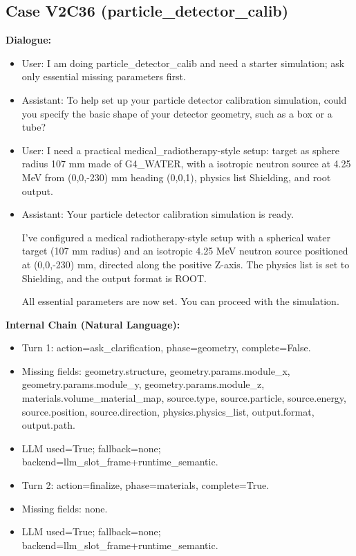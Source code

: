 \documentclass[11pt]{ctexart}
\begin{document}
\subsection{Case V2C36 (particle\_detector\_calib)}
\textbf{Dialogue:}
\begin{itemize}
\item User: I am doing particle\_detector\_calib and need a starter simulation; ask only essential missing parameters first.
\item Assistant: To help set up your particle detector calibration simulation, could you specify the basic shape of your detector geometry, such as a box or a tube?
\item User: I need a practical medical\_radiotherapy-style setup: target as sphere radius 107 mm made of G4\_WATER, with a isotropic neutron source at 4.25 MeV from (0,0,-230) mm heading (0,0,1), physics list Shielding, and root output.
\item Assistant: Your particle detector calibration simulation is ready.

I've configured a medical radiotherapy-style setup with a spherical water target (107 mm radius) and an isotropic 4.25 MeV neutron source positioned at (0,0,-230) mm, directed along the positive Z-axis. The physics list is set to Shielding, and the output format is ROOT.

All essential parameters are now set. You can proceed with the simulation.
\end{itemize}
\textbf{Internal Chain (Natural Language):}
\begin{itemize}
\item Turn 1: action=ask\_clarification, phase=geometry, complete=False.
\item Missing fields: geometry.structure, geometry.params.module\_x, geometry.params.module\_y, geometry.params.module\_z, materials.volume\_material\_map, source.type, source.particle, source.energy, source.position, source.direction, physics.physics\_list, output.format, output.path.
\item LLM used=True; fallback=none; backend=llm\_slot\_frame+runtime\_semantic.
\item Turn 2: action=finalize, phase=materials, complete=True.
\item Missing fields: none.
\item LLM used=True; fallback=none; backend=llm\_slot\_frame+runtime\_semantic.
\end{itemize}
\end{document}
